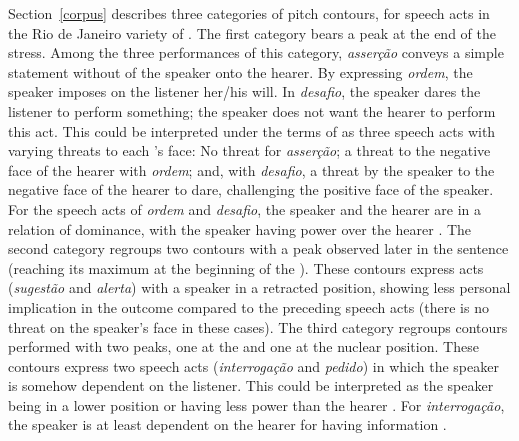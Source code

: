 \documentclass[output=paper]{LSP/langsci}
\begin{document}
Section~\ref{corpus} describes three categories of pitch contours, for speech acts in the Rio de Janeiro variety of .  
The first category bears a peak at the end of the  stress. 
Among the three performances of this category, \textit{asserção} conveys a simple statement without  of the speaker onto the hearer. 
By expressing \textit{ordem}, the speaker imposes on the listener her/his will. 
In \textit{desafio}, the speaker dares the listener to perform something; the speaker does not want the hearer to perform this act. 
This could be interpreted under the terms of \citet{Brown1987} as three speech acts with varying threats to each 's face: No threat for \textit{asserção}; a threat to the negative face of the hearer with \textit{ordem}; and, with \textit{desafio}, a threat by the speaker to the negative face of the hearer to dare, challenging the positive face of the speaker. 
For the speech acts of \textit{ordem} and \textit{desafio}, the speaker and the hearer are in a relation of dominance, with the speaker having power over the hearer \citep{spenceroatey1996power}. 
The second category regroups two contours with a peak observed later in the sentence (reaching its maximum at the beginning of the ). 
These contours express  acts (\textit{sugestão} and \textit{alerta}) with a speaker in a retracted position, showing less personal implication in the outcome compared to the preceding speech acts (there is no threat on the speaker’s face in these cases). 
The third category regroups contours performed with two peaks, one at the  and one at the nuclear position. 
These contours express two speech acts (\textit{interrogação} and \textit{pedido}) in which the speaker is somehow dependent on the listener. 
This could be interpreted as the speaker being in a lower position or having less power than the hearer \citep{spenceroatey1996power}. 
For \textit{interrogação}, the speaker is at least dependent on the hearer for having information \citep[see the interpretation of a ``desire for the goodwill of the receiver'' given in ][343]{ohala1994symbolism}.\largerpage
\end{document}

